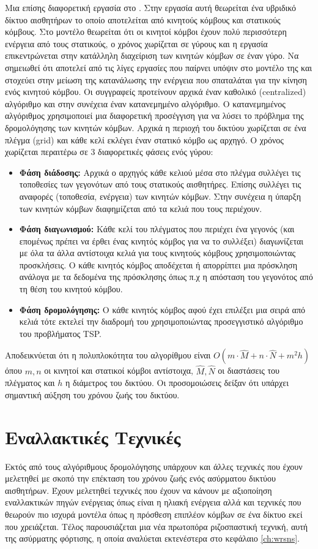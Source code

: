 Μια επίσης διαφορετική εργασία στο \cite{auction_energy_balance}. Στην εργασία αυτή θεωρείται ένα υβριδικό δίκτυο αισθητήρων το οποίο αποτελείται από κινητούς
κόμβους και στατικούς κόμβους. Στο μοντέλο θεωρείται ότι οι κινητοί κόμβοι έχουν πολύ περισσότερη ενέργεια από τους στατικούς, ο χρόνος χωρίζεται σε γύρους και η
εργασία επικεντρώνεται στην κατάλληλη διαχείριση των κινητών κόμβων σε έναν γύρο. Να σημειωθεί ότι αποτελεί από τις λίγες εργασίες που παίρνει υπόψιν στο μοντέλο της
και στοχεύει στην μείωση της κατανάλωσης την ενέργεια που σπαταλάται για την κίνηση ενός κινητού κόμβου. Οι συγγραφείς προτείνουν αρχικά έναν καθολικό (centralized)
αλγόριθμο και στην συνέχεια έναν κατανεμημένο αλγόριθμο. O κατανεμημένος αλγόριθμος χρησιμοποιεί μια διαφορετική προσέγγιση για να λύσει το πρόβλημα της
δρομολόγησης των κινητών κόμβων. Αρχικά η περιοχή του δικτύου χωρίζεται σε ένα πλέγμα (grid) και κάθε κελί εκλέγει έναν στατικό κόμβο ως αρχηγό. Ο χρόνος χωρίζεται
περαιτέρω σε 3 διαφορετικές φάσεις ενός γύρου:
\begin{itemize}
\item \textbf{Φάση διάδοσης:} Αρχικά ο αρχηγός κάθε κελιού μέσα στο πλέγμα συλλέγει τις τοποθεσίες των γεγονότων από τους στατικούς αισθητήρες. Επίσης συλλέγει τις
αναφορές (τοποθεσία, ενέργεια) των κινητών κόμβων. Στην συνέχεια η ύπαρξη των κινητών κόμβων διαφημίζεται από τα κελιά που τους περιέχουν.
\item \textbf{Φάση διαγωνισμού:} Κάθε κελί του πλέγματος που περιέχει ένα γεγονός (και επομένως πρέπει να έρθει ένας κινητός κόμβος για να το συλλέξει) διαγωνίζεται
με όλα τα άλλα αντίστοιχα κελιά για τους κινητούς κόμβους χρησιμοποιώντας προσκλήσεις. Ο κάθε κινητός κόμβος αποδέχεται ή απορρίπτει μια πρόσκληση ανάλογα με τα
δεδομένα της πρόσκλησης όπως π.χ η απόσταση του γεγονότος από τη θέση του κινητού κόμβου.
\item \textbf{Φάση δρομολόγησης:} Ο κάθε κινητός κόμβος αφού έχει επιλέξει μια σειρά από κελιά τότε εκτελεί την διαδρομή του χρησιμοποιώντας προσεγγιστικό αλγόριθμο
του προβλήματος TSP.
\end{itemize}
Αποδεικνύεται ότι η πολυπλοκότητα του αλγορίθμου είναι $O(m\cdot\hat{M} + n\cdot\hat{N} + m^{2}h)$ όπου $m,n$ οι κινητοί και στατικοί κόμβοι αντίστοιχα, $\hat{M},
\hat{N}$ οι διαστάσεις του πλέγματος και $h$ η διάμετρος του δικτύου. Οι προσομοιώσεις δείξαν ότι υπάρχει σημαντική αύξηση του χρόνου ζωής του δικτύου.



\section{Εναλλακτικές Τεχνικές} %
Εκτός από τους αλγόριθμους δρομολόγησης υπάρχουν και άλλες τεχνικές που έχουν μελετηθεί με σκοπό την επέκταση του χρόνου ζωής ενός ασύρματου δικτύου αισθητήρων.
Έχουν μελετηθεί τεχνικές που έχουν να κάνουν με αξιοποίηση εναλλακτικών πηγών ενέργειας όπως είναι η ηλιακή ενέργεια αλλά και τεχνικές που θεωρούν πιο ισχυρά μοντέλα
όπως η πρόσθεση επιπλέον κόμβων σε ένα δίκτυο εκεί που χρειάζεται. Τέλος παρουσιάζεται μια νέα πρωτοπόρα ριζοσπαστική τεχνική, αυτή της ασύρματης
φόρτισης, η οποία αναλύεται εκτενέστερα στο κεφάλαιο \ref{ch:wrsns}.

